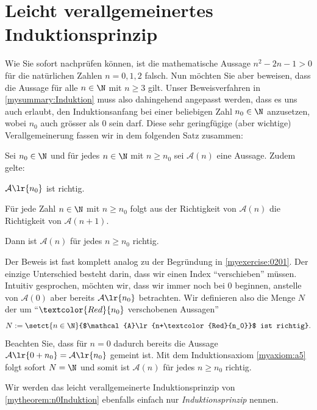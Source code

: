 \section{Leicht verallgemeinertes Induktionsprinzip}
Wie Sie sofort nachprüfen können, ist die mathematische Aussage $n^2 - 2n - 1 > 0$ für die natürlichen Zahlen $n = 0, 1, 2$ falsch. Nun möchten Sie aber beweisen, dass die Aussage für alle $n\in\N$ mit $n\geq 3$ gilt. Unser Beweisverfahren in \cref{mysummary:Induktion} muss also dahingehend angepasst werden, dass es uns auch erlaubt, den Induktionsanfang bei einer beliebigen Zahl $n_0\in\N$ anzusetzen, wobei $n_0$ auch grösser als $0$ sein darf. Diese sehr geringfügige (aber wichtige) Verallgemeinerung fassen wir in dem folgenden Satz zusammen:
\begin{mytheorem}\label{mytheorem:n0Induktion}

	Sei $n_0\in\N$ und für jedes $n\in\N$ mit $n\geq n_0$ sei $\mathcal{A}(n)$ eine Aussage. Zudem gelte:
	\begin{renum}
		\item $\mathcal{A}\lr{n_0}$ ist richtig.
		\item Für jede Zahl $n\in\N$ mit $n\geq n_0$ folgt aus der Richtigkeit von $\mathcal{A}(n)$ die Richtigkeit von $\mathcal{A}(n+1)$.
	\end{renum}
	Dann ist $\mathcal{A}(n)$ für jedes $n\geq n_0$ richtig.
\end{mytheorem}
\begin{myproof}
	Der Beweis ist fast komplett analog zu der Begründung in \cref{myexercise:0201}. Der einzige Unterschied besteht darin, dass wir einen Index \enquote{verschieben} müssen. Intuitiv gesprochen, möchten wir, dass wir immer noch bei $0$ beginnen, anstelle von $\mathcal{A}(0)$ aber bereits $\mathcal{A}\lr{n_0}$ betrachten. Wir definieren also die Menge $N$ der um \enquote{$\textcolor{Red}{n_0}$ verschobenen Aussagen}
	\begin{align*}
		N := \setct{n\in\N}{$\mathcal{A}\lr{n+\textcolor{Red}{n_0}}$ ist richtig}.
	\end{align*}
	Beachten Sie, dass für $n=0$ dadurch bereits die Aussage $\mathcal{A}\lr{0+n_0}=\mathcal{A}\lr{n_0}$ gemeint ist. Mit dem Induktionsaxiom \ref{myaxiom:a5} folgt sofort $N=\N$ und somit ist $\mathcal{A}(n)$ für jedes $n\geq n_0$ richtig.
\end{myproof}

\begin{myremark}
	Wir werden das leicht verallgemeinerte Induktionsprinzip von \cref{mytheorem:n0Induktion} ebenfalls einfach nur \textit{Induktionsprinzip} nennen.
\end{myremark}

